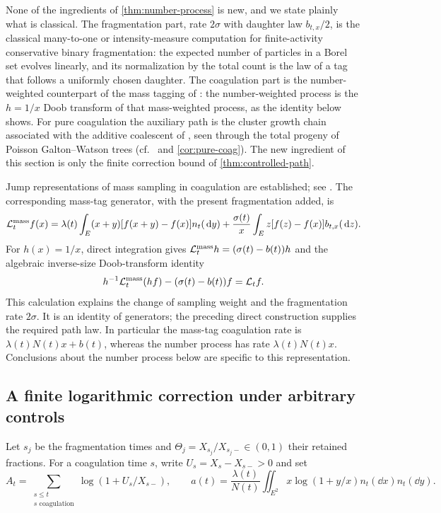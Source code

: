 \begin{remark}
\label{rem:inverse-size}
None of the ingredients of \cref{thm:number-process} is new, and we
state plainly what is classical. The fragmentation part, rate
$2\sigma$ with daughter law $b_{t,x}/2$, is the classical
many-to-one or intensity-measure computation for finite-activity
conservative binary fragmentation: the expected number of particles
in a Borel set evolves linearly, and its normalization by the total
count is the law of a tag that follows a uniformly chosen daughter.
The coagulation part is the number-weighted counterpart of the mass
tagging of \citet{DeaconuFournierTanre2002}: the number-weighted
process is the $h=1/x$ Doob transform of that mass-weighted process,
as the identity below shows. For pure coagulation the auxiliary path
is the cluster growth chain associated with the additive coalescent
of \citet{AldousPitman1998}, seen through the total progeny of
Poisson Galton--Watson trees (cf.\ \citet{Bertoin2002} and
\cref{cor:pure-coag}). The new ingredient of this section is only
the finite correction bound of \cref{thm:controlled-path}.

Jump representations of mass sampling in coagulation are established;
see \citet{DeaconuFournierTanre2002}. The corresponding mass-tag
generator, with the present fragmentation added, is
\[
 \mathcal L_t^{\rm mass}f(x)
 =\lambda(t)\int_E(x+y)[f(x+y)-f(x)]n_t(\,\mathrm d y)
   +\frac{\sigma(t)}x\int_E z[f(z)-f(x)]b_{t,x}(\,\mathrm d z).
\]
For $h(x)=1/x$, direct integration gives
$\mathcal L_t^{\rm mass}h=(\sigma(t)-b(t))h$ and the algebraic
inverse-size Doob-transform identity
\[
 h^{-1}\mathcal L_t^{\rm mass}(hf)
       -(\sigma(t)-b(t))f=\mathcal L_t f.
\]
This calculation explains the change of sampling weight and the
fragmentation rate $2\sigma$. It is an identity of generators;
the preceding direct construction supplies the required path law.
In particular the mass-tag coagulation rate is
$\lambda(t)N(t)x+b(t)$, whereas the number process has rate
$\lambda(t)N(t)x$. Conclusions about the number process below are
specific to this representation.
\end{remark}

\subsection{A finite logarithmic correction under arbitrary controls}

Let $s_j$ be the fragmentation times and
$\Theta_j=X_{s_j}/X_{s_j-}\in(0,1)$ their retained fractions.
For a coagulation time $s$, write $U_s=X_s-X_{s-}>0$ and set
\begin{equation}
 A_t=\sum_{\substack{s\leq t\\s\text{ coagulation}}}
             \log(1+U_s/X_{s-}),\qquad
 a(t)=\frac{\lambda(t)}{N(t)}\iint_{E^2}
           x\log(1+y/x)n_t(\dd x)n_t(\dd y).
 \label{eq:log-correction}
\end{equation}

